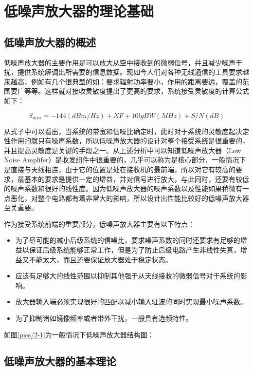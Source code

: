 
\chapter{低噪声放大器的理论基础}
\section{低噪声放大器的概述}

低噪声放大器的主要作用是可以放大从空中接收到的微弱信号，并且减少噪声干扰，提供系统解调出所需要的信息数据。现如今人们对各种无线通信的工具要求越来越高，例如有几个很典型的如：要求辐射功率要小，作用的距离要远，覆盖的范围要广等等。这样就对接收灵敏度提出了更高的要求，系统接受灵敏度的计算公式如下：

\begin{equation}%
S_{min} = -144(dBm/Hz)+NF+10lgBW(MHz)+S/N(dB)
\end{equation}

从式子中可以看出，当系统的带宽和信噪比确定时，此时对于系统的灵敏度起决定性作用的就只有噪声系数，所以低噪声放大器的设计对整个接受系统是很重要的，并且提高灵敏度是关键的手段之一。从上述分析中可以知道低噪声放大器（Low Noise Amplifer）是收发组件中很重要的，几乎可以称为是核心部分，一般情况下是直接与天线相连，由于它的位置是处在接收机的最前端，所以对它有较高的要求，最基本的要求是提供一定的增益，并对信号进行放大，与此同时，还要有较低的噪声系数和很好的线性度。因为低噪声放大器的噪声系数以及性能如果稍微有一点恶化，对整个电路都有着非常大的影响，所以设计出性能比较好的低噪声放大器至关重要。

作为接受系统前端的重要部分，低噪声放大器主要有以下特点：
\begin{itemize}
	\item 为了尽可能的减小后级系统的信噪比，要求噪声系数的同时还要求有足够的增益以保证后级系统能够正常工作，但是为了防止后级电路产生非线性失真，增益又不能太大，而且还要保证放大器处于稳定状态。
	\item 应该有足够大的线性范围以抑制其他强于从天线接收的微弱信号对于系统的影响。
	\item 放大器输入端必须实现很好的匹配以减小输入驻波的同时实现最小噪声系数。
	\item 为了抑制诸如镜像频率或者带外干扰，一般具有选频特性。
\end{itemize}

如图\ref{pics/2-1}为一般情况下低噪声放大器结构图：

\section{低噪声放大器的基本理论}

